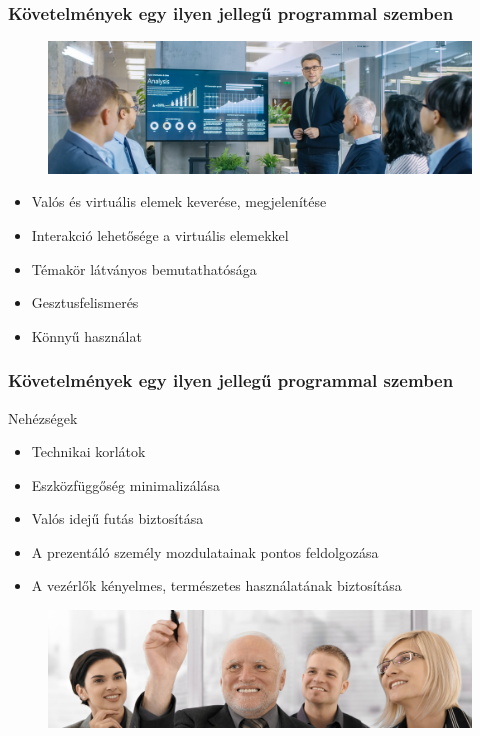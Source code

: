 \documentclass{beamer}
\begin{document}
\begin{frame}[fragile]
\frametitle{Követelmények egy ilyen jellegű programmal szemben}
\begin{figure}[htb]
	\includegraphics[width=\textwidth]{images/presentation_stock_photo.png}
\end{figure}
\begin{block}{}
\begin{itemize}
	\item Valós és virtuális elemek keverése, megjelenítése
	\item Interakció lehetősége a virtuális elemekkel
	\item Témakör látványos bemutathatósága
	\item Gesztusfelismerés
	\item Könnyű használat
\end{itemize}
\end{block}

\end{frame}

\begin{frame}[fragile]
\frametitle{Követelmények egy ilyen jellegű programmal szemben}

\begin{block}{Nehézségek}
\begin{itemize}
	\item Technikai korlátok
	\item Eszközfüggőség minimalizálása
	\item Valós idejű futás biztosítása
	\item A prezentáló személy mozdulatainak pontos feldolgozása
	\item A vezérlők kényelmes, természetes használatának biztosítása
\end{itemize}
\end{block}
\begin{figure}[htb]
	\includegraphics[width=\textwidth]{images/harold.png}
\end{figure}

\end{frame}
\end{document}
